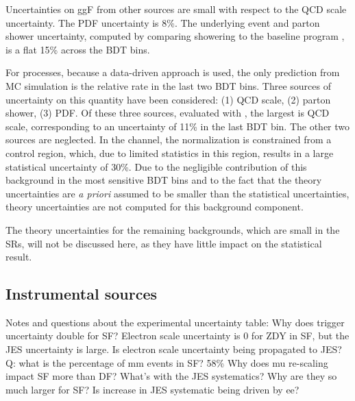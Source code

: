 Uncertainties on ggF from other sources are small with respect to the
QCD scale uncertainty. The PDF uncertainty is 8\%. The underlying
event and parton shower uncertainty, computed by comparing \HERWIG
showering to the baseline program \POWHEG, is a flat 15\% across the
BDT bins. 

For \ZDYll processes, because a data-driven approach is used, the only
prediction from MC simulation is the relative rate in the last two BDT
bins. Three sources of uncertainty
on this quantity have been considered: (1) QCD scale, (2) parton
shower, (3) PDF. Of these three sources, evaluated with \SHERPA, the
largest is QCD scale, corresponding to an uncertainty of 11\% in the
last BDT bin. The other two sources are neglected. In the \emme
channel, the \Ztautaunody normalization is constrained from a control
region, which, due to limited statistics in this region, results in a
large statistical uncertainty of 30\%. Due to the negligible
contribution of this background in the most sensitive BDT bins and to
the fact that the theory uncertainties are {\it a priori} assumed to
be smaller than the statistical uncertainties, theory uncertainties
are not computed for this background component. 

The theory uncertainties for the remaining backgrounds, which are
small in the SRs, will not be discussed here, as they have little
impact on the statistical result. 

\subsection{Instrumental sources}








Notes and questions about the experimental uncertainty table:
Why does trigger uncertainty double for SF?
Electron scale uncertainty is 0 for ZDY in SF, but the JES uncertainty
is large. Is electron scale uncertainty being propagated to JES?
Q: what is the percentage of mm events in SF? 58\%
Why does mu re-scaling impact SF more than DF?
What's with the JES systematics? Why are they so much larger for SF?
Is increase in JES systematic being driven by ee?
